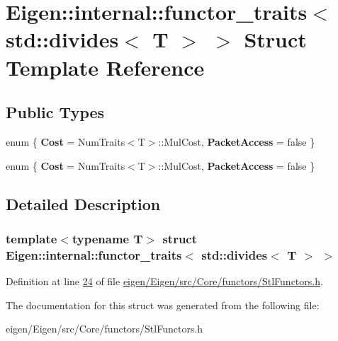 \hypertarget{struct_eigen_1_1internal_1_1functor__traits_3_01std_1_1divides_3_01_t_01_4_01_4}{}\section{Eigen\+:\+:internal\+:\+:functor\+\_\+traits$<$ std\+:\+:divides$<$ T $>$ $>$ Struct Template Reference}
\label{struct_eigen_1_1internal_1_1functor__traits_3_01std_1_1divides_3_01_t_01_4_01_4}
\subsection*{Public Types}
\begin{DoxyCompactItemize}
\item 
\mbox{\label{struct_eigen_1_1internal_1_1functor__traits_3_01std_1_1divides_3_01_t_01_4_01_4_a7acd0cf65f4a975d34057488799fa3aa}} 
enum \{ {\bfseries Cost} = Num\+Traits$<$T$>$\+:\+:Mul\+Cost, 
{\bfseries Packet\+Access} = false
 \}
\item 
\mbox{\label{struct_eigen_1_1internal_1_1functor__traits_3_01std_1_1divides_3_01_t_01_4_01_4_a01848538a3d962ac50f9fd39ef6c1018}} 
enum \{ {\bfseries Cost} = Num\+Traits$<$T$>$\+:\+:Mul\+Cost, 
{\bfseries Packet\+Access} = false
 \}
\end{DoxyCompactItemize}


\subsection{Detailed Description}
\subsubsection*{template$<$typename T$>$\newline
struct Eigen\+::internal\+::functor\+\_\+traits$<$ std\+::divides$<$ T $>$ $>$}



Definition at line \hyperlink{eigen_2_eigen_2src_2_core_2functors_2_stl_functors_8h_source_l00024}{24} of file \hyperlink{eigen_2_eigen_2src_2_core_2functors_2_stl_functors_8h_source}{eigen/\+Eigen/src/\+Core/functors/\+Stl\+Functors.\+h}.



The documentation for this struct was generated from the following file\+:\begin{DoxyCompactItemize}
\item 
eigen/\+Eigen/src/\+Core/functors/\+Stl\+Functors.\+h\end{DoxyCompactItemize}
